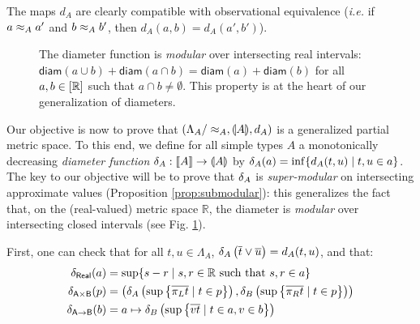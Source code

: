 The maps $d_{A}$ are clearly compatible with observational equivalence (\textit{i.e.} if $a \approx_A a'$ and $b \approx_A b'$, then $d_A(a,b) = d_A(a',b')$). 


\begin{figure}
\caption{\small The diameter function is \emph{modular} over intersecting real intervals: 
$\mathsf{diam}(a\cup  b)+\mathsf{diam}(a\cap b)=\mathsf{diam}(a)+\mathsf{diam}(b)$ for all $a,b\in [\mathbb{R}]$ such that $a\cap b\neq \emptyset$.
This property is at the heart of our generalization of diameters.}
\label{fig:modular}
\end{figure}


Our objective is now to prove that $\left(\Lambda_A/\approx_A, \llparenthesis A \rrparenthesis, d_A\right)$ is a generalized partial metric space.
To this end, we define for all simple types $A$ a monotonically decreasing \emph{diameter function} $\delta_A : \llbracket A \rrbracket \to \llparenthesis A \rrparenthesis$ by $\delta_A(a) = \inf \{ d_A(t,u) \mid t,u \in a \}$. The key to our objective will be to prove that $\delta_{A}$ is \emph{super-modular} on intersecting approximate values (Proposition \ref{prop:submodular}): this generalizes the fact that, on the (real-valued) metric space $\mathbb{R}$, the diameter is \emph{modular} over intersecting closed intervals (see Fig. \ref{fig:modular}).
 
 
 First, one can check that for all $t,u \in \Lambda_A$, $\delta_A\left(\overline{t} \vee \overline{u}\right) = d_A(t,u)$, and that:
\begin{align*}
\delta_\mathsf{Real}(a)  & = \sup\{s-r \mid s,r \in \mathbb{R} \text{ such that } s,r \in a\} \\ 
\delta_\mathsf{A \times B}(p) & = \left(\delta_A\left(\sup\left\{\overline{\pi_L t} \mid t \in p\right\}\right),\delta_B\left(\sup\left\{\overline{\pi_R t} \mid t \in p\right\}\right)\right) \\
\delta_\mathsf{A \to B}(b) & = a \mapsto \delta_B\left(\sup\left\{\overline{vt} \mid t\in a, v \in b\right\}\right)
\end{align*}

